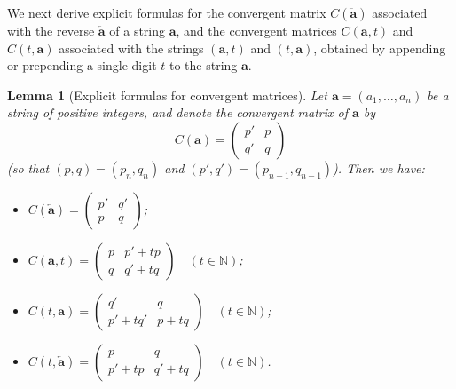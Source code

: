 \documentclass[10pt]{article}
\newtheorem{lemma}{Lemma}
\theoremstyle{definition}
\numberwithin{equation}{section}
\numberwithin{lemma}{section}
\newcommand{\NN}{\mathbb{N}}
\newcommand{\bfa}{\mathbf{a}}
\newcommand{\bfar}{\overleftarrow{\bfa}}
\begin{document}
We next derive explicit formulas for the convergent matrix $C(\bfar)$ 
associated with the reverse $\bfar$ of a string $\bfa$, and the
convergent matrices $C(\bfa,t)$ and $C(t,\bfa)$ associated with the  
strings $(\bfa,t)$ and $(t,\bfa)$, obtained by appending or prepending a
single digit $t$ to the string $\bfa$.

\begin{lemma}[Explicit formulas for convergent matrices]
\label{lem:convergent-matrices}
Let $\bfa=(a_1,\dots,a_n)$
be a string of positive integers, 
and denote the convergent matrix of
$\bfa$ by  
\begin{equation}
\label{eq:convergent-matrix-alt}
C(\bfa)=
\begin{pmatrix} p'&p\\q'&q \end{pmatrix}
\end{equation}
(so that $(p,q)=(p_n,q_n)$ and $(p',q')=(p_{n-1},q_{n-1})$).
Then we have:
\begin{itemize}
\item[(i)]
$\displaystyle C(\bfar)=
\begin{pmatrix} p' & q'\\p&q\end{pmatrix}$;

\item[(ii)]
$\displaystyle C(\bfa,t)=
\begin{pmatrix} p & p'+tp\\ q&q'+tq \end{pmatrix}
\quad (t\in\NN)$;

\item[(iii)]
$\displaystyle 
C(t,\bfa)=
\begin{pmatrix} q' & q \\ p'+tq'& p+tq \end{pmatrix}
\quad (t\in\NN)$;

\item[(iv)]
$\displaystyle
C(t,\bfar)=
\begin{pmatrix} p & q \\ p'+tp& q'+tq \end{pmatrix}
\quad (t\in\NN)$.
\end{itemize}
\end{lemma}
\end{document}
